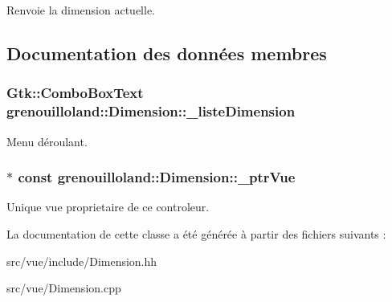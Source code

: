 \begin{DoxyReturn}{Renvoie}
la dimension actuelle. 
\end{DoxyReturn}


\subsection{Documentation des données membres}
\hypertarget{classgrenouilloland_1_1Dimension_aea2f6714737f26588395db30cb0385bd}{
\subsubsection[{\-\_\-liste\-Dimension}]{\setlength{\rightskip}{0pt plus 5cm}Gtk\-::\-Combo\-Box\-Text grenouilloland\-::\-Dimension\-::\-\_\-liste\-Dimension\hspace{0.3cm}{\ttfamily [protected]}}}\label{classgrenouilloland_1_1Dimension_aea2f6714737f26588395db30cb0385bd}
Menu déroulant. \hypertarget{classgrenouilloland_1_1Dimension_a5b66fbce9d7f6eed85d39f90bb71d7c7}{
\subsubsection[{\-\_\-ptr\-Vue}]{$\ast$ const grenouilloland\-::\-Dimension\-::\-\_\-ptr\-Vue\hspace{0.3cm}{\ttfamily [protected]}}}\label{classgrenouilloland_1_1Dimension_a5b66fbce9d7f6eed85d39f90bb71d7c7}
Unique vue proprietaire de ce controleur. 

La documentation de cette classe a été générée à partir des fichiers suivants \-:\begin{DoxyCompactItemize}
\item 
src/vue/include/Dimension.\-hh\item 
src/vue/Dimension.\-cpp\end{DoxyCompactItemize}
